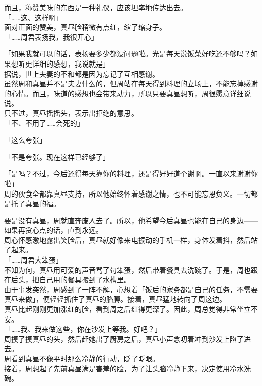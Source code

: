 而且，称赞美味的东西是一种礼仪，应该坦率地传达出去。\\

「……这、这样啊」\\

面对正面的赞美，真昼脸稍微有点红，缩了缩身子。\\

「……周君表扬我，我很开心」

「如果我就可以的话，表扬要多少都没问题啦。光是每天说饭菜好吃还不够吗？如果想听更详细的感想，我说就是」\\

据说，世上夫妻的不和都是因为忘记了互相感谢。\\

虽然周和真昼并不是夫妻什么的，但周站在每天得到料理的立场上，不能忘掉感谢的心情。而且，味道的感想也会带来动力，所以只要真昼想听，周很愿意详细说说。\\

只不过，真昼摇摇头，表示出拒绝的意思。\\

「不、不用了……会死的」

「这么夸张」

「不是夸张。现在这样已经够了」

「是吗？不过，今后还得每天靠你的料理，还是得好好道个谢啊。一直以来谢谢你啦」\\

周的伙食全都靠真昼支持，所以他始终怀着感谢之情，也不可能忘恩负义。一切都是托了真昼的福。

要是没有真昼，周就直奔废人去了。所以，他希望今后真昼也能在自己的身边——如果再贪心点的话，直到永远。\\

周心怀感激地露出笑脸后，真昼就好像来电振动的手机一样，身体发着抖，然后站了起来。\\

「……周君大笨蛋」\\

不知为何，真昼用可爱的声音骂了句笨蛋，然后带着餐具去洗碗了。于是，周也跟在后头，把自己用的餐具搬到了水槽里。\\

由于事发突然，周感到了一阵不解，心想着「饭后的家务都是自己的任务，不需要真昼来做」，便轻轻抓住了真昼的胳膊。接着，真昼猛地转向了周这边。\\

真昼比起刚刚更加涨红的脸，看到周之后红得更深了。因此，周总觉得非常坐立不安。\\

「……我、我来做这些，你在沙发上等我。好吧？」\\

周摸了摸真昼的头，然后赶她出了厨房之后，真昼小声念叨着冲到沙发上陷了进去。\\

周看到真昼不像平时那么冷静的行动，眨了眨眼。\\

接着，周想起了先前真昼满是害羞的脸，为了让头脑冷静下来，决定使用冷水洗碗。
